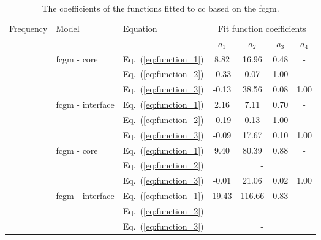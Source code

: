 \begin{table}[ht]
	\small
	\tabcolsep=0.2cm
	\centering
	\caption{\label{tab:fit_fcgm_CC}The coefficients of the functions fitted to \acf{cc} based on the \acf{fcgm}.}
	\begin{tabular}{cllcccc}
		\toprule
		\multirow{2}{*}{Frequency} & \multirow{2}{*}{Model} & Equation & \multicolumn{4}{c}{Fit function coefficients}\\
		& & & \(a_1\) & \(a_2\) & \(a_3\) & \(a_4\)\\
		\midrule
		\multirow{6}{*}{\rotatebox[origin=c]{90}{50 \unit{\kHz}}} & \multirow{3}{*}{\ac{fcgm} - core} & Eq.~(\ref{eq:function_1}) & 8.82 & 16.96 & 0.48 &-\\
		& & Eq.~(\ref{eq:function_2}) & -0.33 & 0.07 & 1.00 &- \\
		& & Eq.~(\ref{eq:function_3}) & -0.13 & 38.56 & 0.08 & 1.00 \\
		\cline{2-7}
		& \multirow{3}{*}{\ac{fcgm} - interface} & Eq.~(\ref{eq:function_1}) & 2.16 & 7.11 & 0.70 &- \\
		& & Eq.~(\ref{eq:function_2}) & -0.19 & 0.13 & 1.00 & -\\
		& & Eq.~(\ref{eq:function_3}) & -0.09 & 17.67 & 0.10 & 1.00 \\
		\midrule
		\multirow{6}{*}{\rotatebox[origin=c]{90}{100 \unit{\kHz}}} & \multirow{3}{*}{\ac{fcgm} - core} & Eq.~(\ref{eq:function_1}) & 9.40 & 80.39 & 0.88 &-\\
		& & Eq.~(\ref{eq:function_2}) & \multicolumn{4}{c}{-} \\
		& & Eq.~(\ref{eq:function_3}) & -0.01 & 21.06 & 0.02 & 1.00\\
		\cline{2-7}
		& \multirow{3}{*}{\ac{fcgm} - interface} & Eq.~(\ref{eq:function_1}) & 19.43 & 116.66 & 0.83 &-\\
		& & Eq.~(\ref{eq:function_2}) & \multicolumn{4}{c}{-} \\
		& & Eq.~(\ref{eq:function_3}) & \multicolumn{4}{c}{-} \\
		\bottomrule
	\end{tabular}
\end{table}

